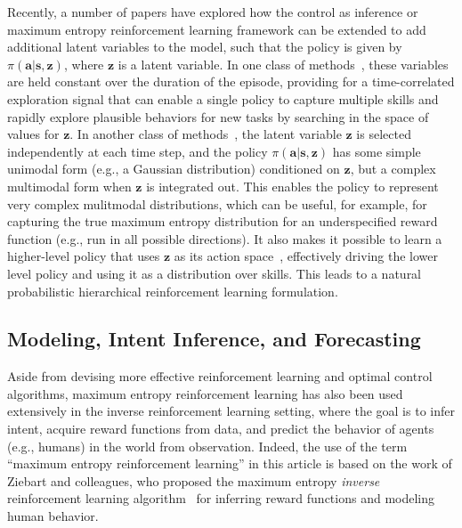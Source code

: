 Recently, a number of papers have explored how the control as inference or maximum entropy reinforcement learning framework can be extended to add additional latent variables to the model, such that the policy is given by $\pi(\mathbf{a}|\mathbf{s},\mathbf{z})$, where $\mathbf{z}$ is a latent variable. In one class of methods~\citep{hausman,learning_to_explore}, these variables are held constant over the duration of the episode, providing for a time-correlated exploration signal that can enable a single policy to capture multiple skills and rapidly explore plausible behaviors for new tasks by searching in the space of values for $\mathbf{z}$. In another class of methods~\citep{haarnoja,realnvp}, the latent variable $\mathbf{z}$ is selected independently at each time step, and the policy $\pi(\mathbf{a}|\mathbf{s},\mathbf{z})$ has some simple unimodal form (e.g., a Gaussian distribution) conditioned on $\mathbf{z}$, but a complex multimodal form when $\mathbf{z}$ is integrated out. This enables the policy to represent very complex mulitmodal distributions, which can be useful, for example, for capturing the true maximum entropy distribution for an underspecified reward function (e.g., run in all possible directions). It also makes it possible to learn a higher-level policy that uses $\mathbf{z}$ as its action space~\citep{realnvp}, effectively driving the lower level policy and using it as a distribution over skills. This leads to a natural probabilistic hierarchical reinforcement learning formulation.

\subsection{Modeling, Intent Inference, and Forecasting}
\label{sec:modeling}

Aside from devising more effective reinforcement learning and optimal control algorithms, maximum entropy reinforcement learning has also been used extensively in the inverse reinforcement learning setting, where the goal is to infer intent, acquire reward functions from data, and predict the behavior of agents (e.g., humans) in the world from observation. Indeed, the use of the term ``maximum entropy reinforcement learning'' in this article is based on the work of Ziebart and colleagues, who proposed the maximum entropy \emph{inverse} reinforcement learning algorithm~\citep{maxentirl} for inferring reward functions and modeling human behavior.

